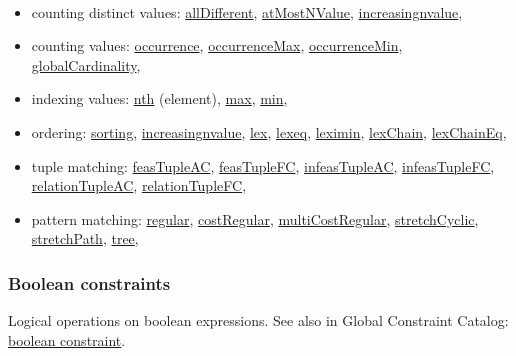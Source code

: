 \vspace{1em}\noindent\begin{notedef}\tt
  \begin{itemize}
  \item counting distinct values: 
\hyperlink{alldifferent:alldifferentconstraint}{allDifferent}, 
\hyperlink{atmostnvalue:atmostnvalueconstraint}{atMostNValue},
\hyperlink{increasingnvalue:increasingnvalueconstraint}{increasingnvalue},
  \item counting values: 
\hyperlink{occurrence:occurrenceconstraint}{occurrence},
\hyperlink{occurrencemax:occurrencemaxconstraint}{occurrenceMax},
\hyperlink{occurrencemin:occurrenceminconstraint}{occurrenceMin},
\hyperlink{globalcardinality:globalcardinalityconstraint}{globalCardinality},
  \item indexing values: 
\hyperlink{nth:nthconstraint}{nth} (element),
\hyperlink{max:maxconstraint}{max},
\hyperlink{min:minconstraint}{min},
  \item ordering: 
\hyperlink{sorting:sortingconstraint}{sorting},
\hyperlink{increasingnvalue:increasingnvalueconstraint}{increasingnvalue},
\hyperlink{lex:lexconstraint}{lex}, 
\hyperlink{lexeq:lexeqconstraint}{lexeq},
\hyperlink{leximin:leximinconstraint}{leximin},
\hyperlink{lexchain:lexchainconstraint}{lexChain},
\hyperlink{lexchaineq:lexchaineqconstraint}{lexChainEq},
  \item tuple matching: 
\hyperlink{feastupleac:feastupleacconstraint}{feasTupleAC},
\hyperlink{feastuplefc:feastuplefcconstraint}{feasTupleFC},
\hyperlink{infeastupleac:infeastupleacconstraint}{infeasTupleAC},
\hyperlink{infeastuplefc:infeastuplefcconstraint}{infeasTupleFC},
\hyperlink{relationtupleac:relationtupleacconstraint}{relationTupleAC},
\hyperlink{relationtuplefc:relationtuplefcconstraint}{relationTupleFC},
  \item pattern matching: 
\hyperlink{regular:regularconstraint}{regular},
\hyperlink{costregular:costregularconstraint}{costRegular},
\hyperlink{multicostregular:multicostregularconstraint}{multiCostRegular}, 
\hyperlink{stretchcyclic:stretchcyclicconstraint}{stretchCyclic}, 
\hyperlink{stretchpath:stretchpathconstraint}{stretchPath}, 
\hyperlink{tree:treeconstraint}{tree},
  \end{itemize}
\end{notedef}

\subsubsection{Boolean constraints}\label{model:logicconstraints}\hypertarget{model:logicconstraints}{}
Logical operations on boolean expressions.
See also in Global Constraint Catalog: \href{http://www.emn.fr/x-info/sdemasse/gccat/KBoolean_constraint.html}{boolean constraint}.

